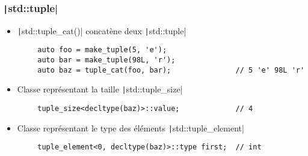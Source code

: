 \documentclass[C++.tex]{subfiles}
\begin{document}
\begin{frame}[fragile]
	\frametitle{\texttt|std::tuple|}
	\begin{itemize}
		\item \texttt|std::tuple_cat()| concatène deux \texttt|std::tuple|
	\end{itemize}

	\begin{verbatim}
		auto foo = make_tuple(5, 'e');
		auto bar = make_tuple(98L, 'r');
		auto baz = tuple_cat(foo, bar);               // 5 'e' 98L 'r'
	\end{verbatim}

	\begin{itemize}
		\item Classe représentant la taille \texttt|std::tuple_size|
	\end{itemize}

	\begin{verbatim}
		tuple_size<decltype(baz)>::value;             // 4
	\end{verbatim}

	\begin{itemize}
		\item Classe représentant le type des éléments \texttt|std::tuple_element|
	\end{itemize}

	\begin{verbatim}
		tuple_element<0, decltype(baz)>::type first;  // int
	\end{verbatim}

\end{frame}
\end{document}
